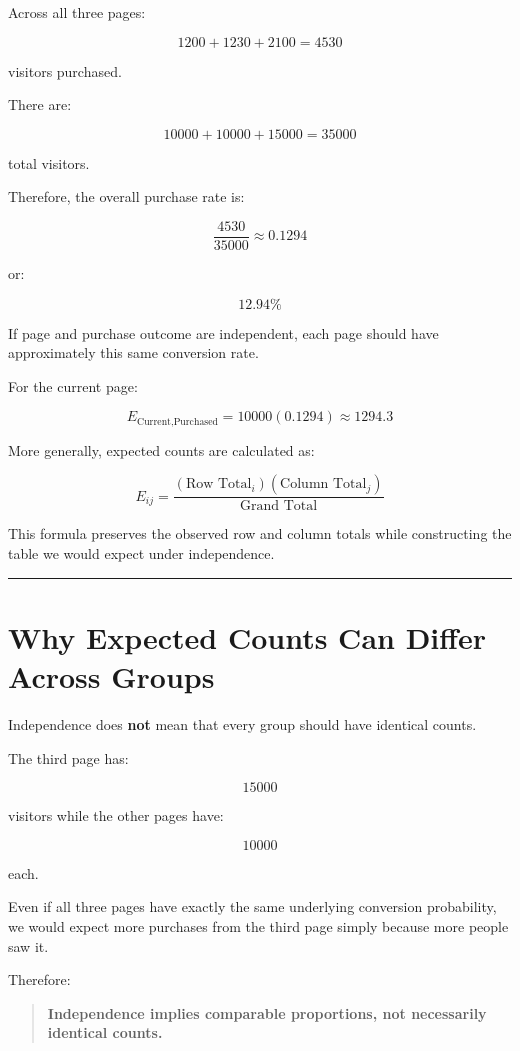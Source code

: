 \documentclass[
  letterpaper,
  DIV=11,
  numbers=noendperiod]{scrreprt}
\begin{document}
Across all three pages:

\[
1200+1230+2100
=
4530
\]

visitors purchased.

There are:

\[
10000+10000+15000
=
35000
\]

total visitors.

Therefore, the overall purchase rate is:

\[
\frac{4530}{35000}
\approx
0.1294
\]

or:

\[
12.94\%
\]

If page and purchase outcome are independent, each page should have
approximately this same conversion rate.

For the current page:

\[
E_{\text{Current,Purchased}}
=
10000(0.1294)
\approx
1294.3
\]

More generally, expected counts are calculated as:

\[
\boxed{
E_{ij}
=
\frac{
(\text{Row Total}_i)
(\text{Column Total}_j)
}{
\text{Grand Total}
}
}
\]

This formula preserves the observed row and column totals while
constructing the table we would expect under independence.

\begin{center}\rule{0.5\linewidth}{0.5pt}\end{center}


\chapter{Why Expected Counts Can Differ Across
Groups}\label{why-expected-counts-can-differ-across-groups}

Independence does \textbf{not} mean that every group should have
identical counts.

The third page has:

\[
15000
\]

visitors while the other pages have:

\[
10000
\]

each.

Even if all three pages have exactly the same underlying conversion
probability, we would expect more purchases from the third page simply
because more people saw it.

Therefore:

\begin{quote}
\textbf{Independence implies comparable proportions, not necessarily
identical counts.}
\end{quote}
\end{document}

